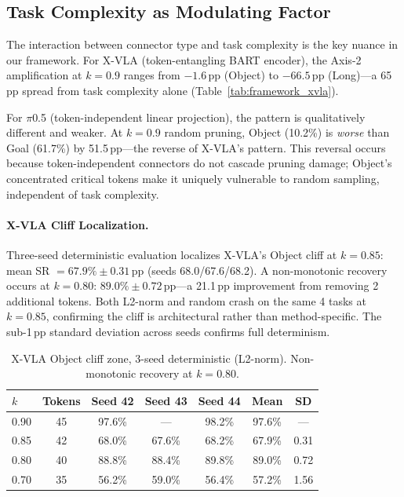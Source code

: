 \documentclass[10pt,twocolumn]{article}
\begin{document}
\subsection{Task Complexity as Modulating Factor}
\label{sec:task_complexity}

The interaction between connector type and task complexity is the key nuance in our framework.
For X-VLA (token-entangling BART encoder), the Axis-2 amplification at $k\!=\!0.9$ ranges from $-1.6$\,pp (Object) to $-66.5$\,pp (Long)---a 65\,pp spread from task complexity alone (Table~\ref{tab:framework_xvla}).

For $\pi$0.5 (token-independent linear projection), the pattern is qualitatively different and weaker.
At $k\!=\!0.9$ random pruning, Object (10.2\%) is \emph{worse} than Goal (61.7\%) by 51.5\,pp---the reverse of X-VLA's pattern.
This reversal occurs because token-independent connectors do not cascade pruning damage; Object's concentrated critical tokens make it uniquely vulnerable to random sampling, independent of task complexity.

\paragraph{X-VLA Cliff Localization.}
Three-seed deterministic evaluation localizes X-VLA's Object cliff at $k\!=\!0.85$: mean SR $=67.9\%\pm0.31$\,pp (seeds 68.0/67.6/68.2).
A non-monotonic recovery occurs at $k\!=\!0.80$: $89.0\%\pm0.72$\,pp---a 21.1\,pp improvement from removing 2 additional tokens.
Both L2-norm and random crash on the same 4 tasks at $k\!=\!0.85$, confirming the cliff is architectural rather than method-specific.
The sub-1\,pp standard deviation across seeds confirms full determinism.

\begin{table}[t]
\centering
\caption{X-VLA Object cliff zone, 3-seed deterministic (L2-norm). Non-monotonic recovery at $k\!=\!0.80$.}
\label{tab:xvla_cliff}
\small
\begin{tabular}{@{}lcccccc@{}}
\toprule
$k$ & Tokens & Seed 42 & Seed 43 & Seed 44 & Mean & SD \\
\midrule
0.90 & 45 & 97.6\% & --- & 98.2\% & 97.6\% & --- \\
0.85 & 42 & 68.0\% & 67.6\% & 68.2\% & 67.9\% & 0.31 \\
0.80 & 40 & 88.8\% & 88.4\% & 89.8\% & 89.0\% & 0.72 \\
0.70 & 35 & 56.2\% & 59.0\% & 56.4\% & 57.2\% & 1.56 \\
\bottomrule
\end{tabular}
\end{table}
\end{document}
